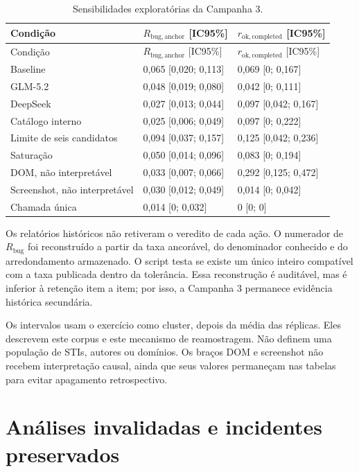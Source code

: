\documentclass[11pt,a4paper]{article}
\newcommand{\Rbug}{\ensuremath{R_{\mathrm{bug}}}}
\newcommand{\Rbuganchor}{\ensuremath{R_{\mathrm{bug,anchor}}}}
\newcommand{\Rokcompleted}{\ensuremath{r_{\mathrm{ok,completed}}}}
\begin{document}
\begingroup
\footnotesize
\setlength{\tabcolsep}{3pt}
\begin{longtable}{@{}P{5.0cm}C{3.7cm}C{3.7cm}@{}}
\caption{Sensibilidades exploratórias da Campanha 3.}\label{tab:s-c3-sens}\\
\toprule
Condição & \Rbuganchor{} [IC95\%] & \Rokcompleted{} [IC95\%] \\
\midrule
\endfirsthead
\toprule
Condição & \Rbuganchor{} [IC95\%] & \Rokcompleted{} [IC95\%] \\
\midrule
\endhead
Baseline & 0,065 [0,020; 0,113] & 0,069 [0; 0,167] \\
GLM-5.2 & 0,048 [0,019; 0,080] & 0,042 [0; 0,111] \\
DeepSeek & 0,027 [0,013; 0,044] & 0,097 [0,042; 0,167] \\
Catálogo interno & 0,025 [0,006; 0,049] & 0,097 [0; 0,222] \\
Limite de seis candidatos & 0,094 [0,037; 0,157] & 0,125 [0,042; 0,236] \\
Saturação & 0,050 [0,014; 0,096] & 0,083 [0; 0,194] \\
DOM, não interpretável & 0,033 [0,007; 0,066] & 0,292 [0,125; 0,472] \\
Screenshot, não interpretável & 0,030 [0,012; 0,049] & 0,014 [0; 0,042] \\
Chamada única & 0,014 [0; 0,032] & 0 [0; 0] \\
\bottomrule
\end{longtable}
\endgroup

Os relatórios históricos não retiveram o veredito de cada ação. O numerador de \Rbug{} foi reconstruído a partir da taxa ancorável, do denominador conhecido e do arredondamento armazenado. O script testa se existe um único inteiro compatível com a taxa publicada dentro da tolerância. Essa reconstrução é auditável, mas é inferior à retenção item a item; por isso, a Campanha 3 permanece evidência histórica secundária.

Os intervalos usam o exercício como cluster, depois da média das réplicas. Eles descrevem este corpus e este mecanismo de reamostragem. Não definem uma população de STIs, autores ou domínios. Os braços DOM e screenshot não recebem interpretação causal, ainda que seus valores permaneçam nas tabelas para evitar apagamento retrospectivo.

\section{Análises invalidadas e incidentes preservados}
\end{document}
